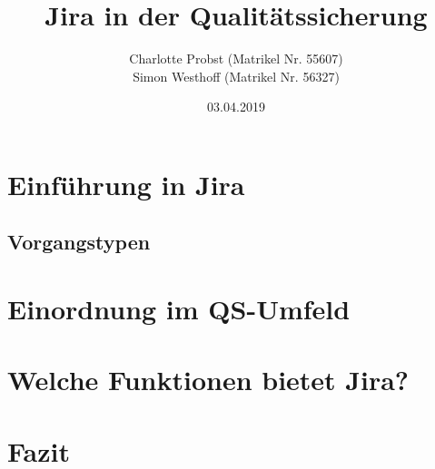 \documentclass[a4paper, 10pt]{scrartcl}
\title{Jira in der Qualitätssicherung}
\author{Charlotte Probst (Matrikel Nr. 55607)\\
 Simon Westhoff (Matrikel Nr. 56327)}
\date{03.04.2019}
\begin{document}
\maketitle


\newpage

\tableofcontents

\newpage

\section{Einführung in Jira}
\subsection{Vorgangstypen}

\section{Einordnung im QS-Umfeld}

\section{Welche Funktionen bietet Jira?}

\section{Fazit}
\end{document}
